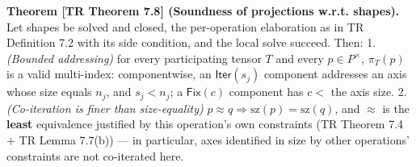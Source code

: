 \documentclass[
  10pt,
  letterpaper,
]{article}
\begin{document}
\textbf{Theorem {[}TR Theorem 7.8{]} (Soundness of projections w.r.t.
shapes).} Let shapes be solved and closed, the per-operation elaboration
as in TR Definition 7.2 with its side condition, and the local solve
succeed. Then: 1. \emph{(Bounded addressing)} for every participating
tensor \(T\) and every \(p \in P^\times\), \(\pi_T(p)\) is a valid
multi-index: componentwise, an \(\mathsf{Iter}(s_j)\) component
addresses an axis whose size equals \(n_j\), and \(s_j < n_j\); a
\(\mathsf{Fix}(c)\) component has \(c <\) the axis size. 2.
\emph{(Co-iteration is finer than size-equality)}
\(p \approx q \Rightarrow \mathrm{sz}(p) = \mathrm{sz}(q)\), and
\(\approx\) is the \textbf{least} equivalence justified by this
operation's own constraints (TR Theorem 7.4 + TR Lemma 7.7(b)) --- in
particular, axes identified in size by other operations' constraints are
not co-iterated here.
\end{document}
